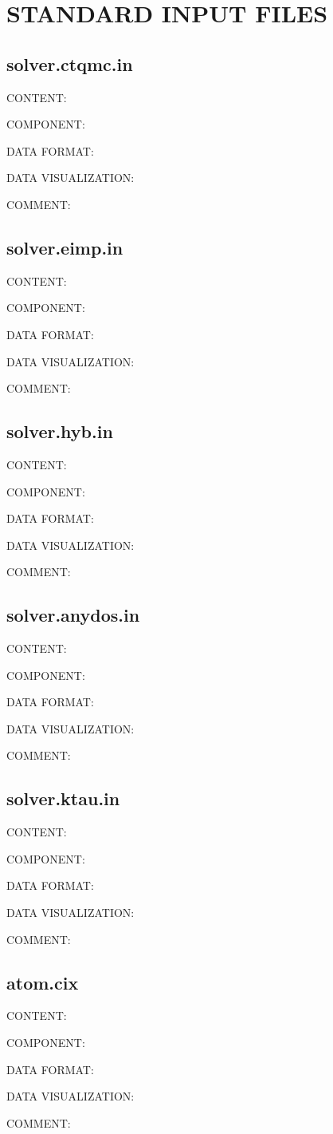 \chapter{STANDARD INPUT FILES}
\section{solver.ctqmc.in}
{\color{red}CONTENT:}

{\color{green}COMPONENT:}

{\color{blue}DATA FORMAT:}

{\color{brown}DATA VISUALIZATION:}

{\color{purple}COMMENT:}

\section{solver.eimp.in}
{\color{red}CONTENT:}

{\color{green}COMPONENT:}

{\color{blue}DATA FORMAT:}

{\color{brown}DATA VISUALIZATION:}

{\color{purple}COMMENT:}

\section{solver.hyb.in}
{\color{red}CONTENT:}

{\color{green}COMPONENT:}

{\color{blue}DATA FORMAT:}

{\color{brown}DATA VISUALIZATION:}

{\color{purple}COMMENT:}

\section{solver.anydos.in}
{\color{red}CONTENT:}

{\color{green}COMPONENT:}

{\color{blue}DATA FORMAT:}

{\color{brown}DATA VISUALIZATION:}

{\color{purple}COMMENT:}

\section{solver.ktau.in}
{\color{red}CONTENT:}

{\color{green}COMPONENT:}

{\color{blue}DATA FORMAT:}

{\color{brown}DATA VISUALIZATION:}

{\color{purple}COMMENT:}

\section{atom.cix}
{\color{red}CONTENT:}

{\color{green}COMPONENT:}

{\color{blue}DATA FORMAT:}

{\color{brown}DATA VISUALIZATION:}

{\color{purple}COMMENT:}
